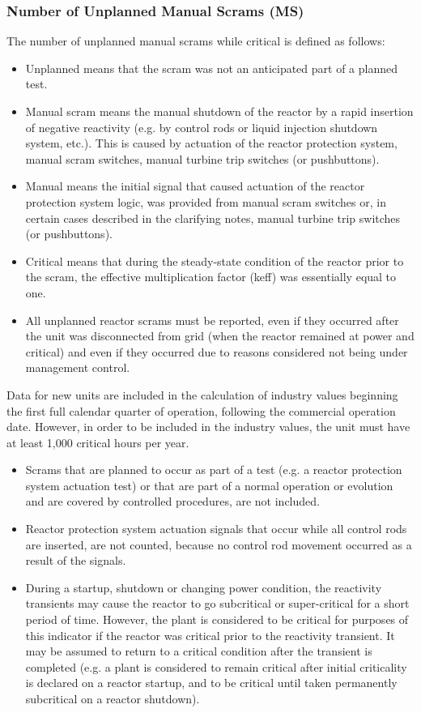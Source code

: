 \subsubsection{Number of Unplanned Manual Scrams (MS)}

The number of unplanned manual scrams while critical is defined as
follows:
\begin{itemize}
\item Unplanned means that the scram was not an anticipated part of a planned test.
\item Manual scram means the manual shutdown of the reactor by a rapid insertion of negative reactivity (e.g. by control rods or liquid injection shutdown system, etc.). This is caused by actuation of the reactor protection system, manual scram switches, manual turbine trip switches (or pushbuttons).
\item Manual means the initial signal that caused actuation of the reactor protection system logic, was provided from manual scram switches or, in certain cases described in the clarifying notes, manual turbine trip switches (or pushbuttons).
\item Critical means that during the steady-state condition of the reactor prior to the scram, the effective multiplication factor (keff) was essentially equal to one.
\item All unplanned reactor scrams must be reported, even if they
  occurred after the unit was disconnected from grid (when the reactor
  remained at power and critical) and even if they occurred due to
  reasons considered not being under management control.
\end{itemize}

Data for new units are included in the calculation of industry values
beginning the first full calendar quarter of operation, following the
commercial operation date. However, in order to be included in the
industry values, the unit must have at least 1,000 critical hours per
year.
\begin{itemize}
\item Scrams that are planned to occur as part of a test (e.g. a reactor protection system actuation test) or that are part of a normal operation or evolution and are covered by controlled procedures, are not included.
\item Reactor protection system actuation signals that occur while all control rods are inserted, are not counted, because no control rod movement occurred as a result of the signals.
\item During a startup, shutdown or changing power condition, the
  reactivity transients may cause the reactor to go subcritical or
  super-critical for a short period of time. However, the plant is
  considered to be critical for purposes of this indicator if the
  reactor was critical prior to the reactivity transient. It may be
  assumed to return to a critical condition after the transient is
  completed (e.g. a plant is considered to remain critical after
  initial criticality is declared on a reactor startup, and to be
  critical until taken permanently subcritical on a reactor shutdown).
\end{itemize}

